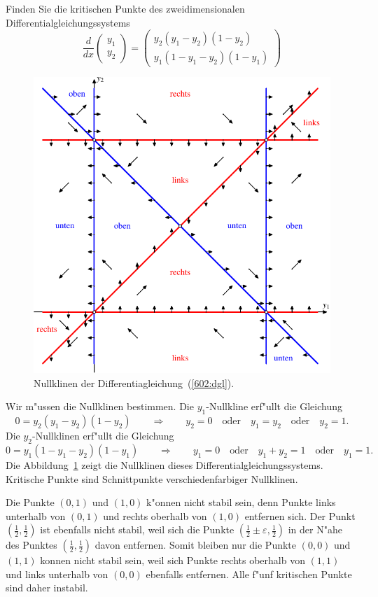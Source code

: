 Finden Sie die kritischen Punkte des zweidimensionalen
Differentialgleichungssystems
\begin{equation}
\frac{d}{dx}\begin{pmatrix}y_1\\y_2\end{pmatrix}
=
\begin{pmatrix}
y_2(y_1-y_2)(1-y_2)\\
y_1(1-y_1-y_2)(1-y_1)
\end{pmatrix}
\label{602:dgl}
\end{equation}

\begin{loesung}
\begin{figure}
\centering
\includegraphics{../skript/uebungsaufgaben/602-1.pdf}
\caption{Nullklinen der Differentiagleichung~(\ref{602:dgl}).
\label{602:nullklinen}}
\end{figure}
Wir m"ussen die Nullklinen bestimmen.
Die $y_1$-Nullkline erf"ullt die Gleichung
\[
0=y_2(y_1-y_2)(1-y_2)
\qquad\Rightarrow\qquad
y_2=0
\quad\text{oder}\quad
y_1=y_2
\quad\text{oder}\quad
y_2=1.
\]
Die $y_2$-Nullklinen erf"ullt die Gleichung
\[
0=y_1(1-y_1-y_2)(1-y_1)
\qquad\Rightarrow\qquad
y_1=0
\quad\text{oder}\quad
y_1+y_2=1
\quad\text{oder}\quad
y_1=1.
\]
Die Abbildung~\ref{602:nullklinen} zeigt die Nullklinen dieses
Differentialgleichungssystems. 
Kritische Punkte sind Schnittpunkte verschiedenfarbiger Nullklinen.

Die Punkte $(0,1)$ und $(1,0)$ k"onnen nicht stabil sein, denn Punkte
links unterhalb von $(0,1)$ und rechts oberhalb von $(1,0)$ entfernen sich.
Der Punkt $(\frac12,\frac12)$ ist ebenfalls nicht stabil, weil sich die
Punkte $(\frac12\pm\varepsilon,\frac12)$ in der N"ahe des Punktes
$(\frac12,\frac12)$ davon entfernen.
Somit bleiben nur die Punkte $(0,0)$ und $(1,1)$ konnen nicht
stabil sein, weil sich Punkte rechts oberhalb von $(1,1)$ 
und links unterhalb von $(0,0)$ ebenfalls entfernen.
Alle f"unf kritischen Punkte sind daher instabil.
\end{loesung}


